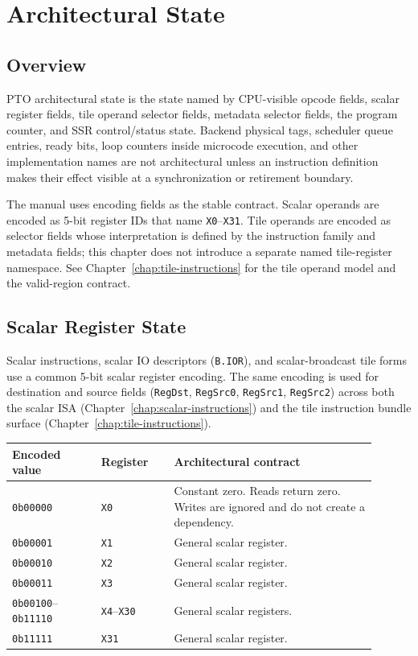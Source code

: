 \chapter{Architectural State}
\label{chap:architectural-state}

\section{Overview}
PTO architectural state is the state named by CPU-visible opcode fields, scalar register fields, tile operand selector fields, metadata selector fields, the program counter, and SSR control/status state. Backend physical tags, scheduler queue entries, ready bits, loop counters inside microcode execution, and other implementation names are not architectural unless an instruction definition makes their effect visible at a synchronization or retirement boundary.

The manual uses encoding fields as the stable contract. Scalar operands are encoded as 5-bit register IDs that name \texttt{X0}--\texttt{X31}. Tile operands are encoded as selector fields whose interpretation is defined by the instruction family and metadata fields; this chapter does not introduce a separate named tile-register namespace. See Chapter~\ref{chap:tile-instructions} for the tile operand model and the valid-region contract.

\section{Scalar Register State}
\label{sec:scalar_register_state}
Scalar instructions, scalar IO descriptors (\texttt{B.IOR}), and scalar-broadcast tile forms use a common 5-bit scalar register encoding. The same encoding is used for destination and source fields (\texttt{RegDst}, \texttt{RegSrc0}, \texttt{RegSrc1}, \texttt{RegSrc2}) across both the scalar ISA (Chapter~\ref{chap:scalar-instructions}) and the tile instruction bundle surface (Chapter~\ref{chap:tile-instructions}).

\begin{longtable}{@{}L{0.22\linewidth}L{0.18\linewidth}L{0.50\linewidth}@{}}
\toprule
Encoded value & Register & Architectural contract \\
\midrule
\texttt{0b00000} & \texttt{X0} & Constant zero. Reads return zero. Writes are ignored and do not create a dependency. \\
\texttt{0b00001} & \texttt{X1} & General scalar register. \\
\texttt{0b00010} & \texttt{X2} & General scalar register. \\
\texttt{0b00011} & \texttt{X3} & General scalar register. \\
\texttt{0b00100}--\texttt{0b11110} & \texttt{X4}--\texttt{X30} & General scalar registers. \\
\texttt{0b11111} & \texttt{X31} & General scalar register. \\
\bottomrule
\end{longtable}

